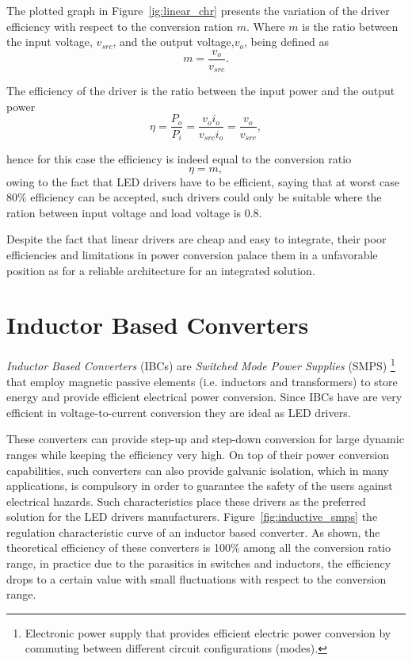 The plotted graph in Figure~\ref{ig:linear_chr} presents the variation of the driver efficiency with respect to the conversion ration $m$. Where $m$  is the ratio between the input voltage, $v_{src}$,  and the output voltage,$v_o$, being defined as
   \begin{equation}
        m = \frac{v_o}{v_{src}}.
   \end{equation}

The efficiency of the driver is the ratio between the input power and the output power
   \begin{equation}
        \eta = \frac{P_o}{P_i} = \frac{v_o i_o}{v_{src} i_o} = \frac{v_o}{v_{src}},
   \end{equation}

hence for this case the efficiency is indeed equal to the conversion ratio
   \begin{equation}
        \eta = m,
   \end{equation}
owing to the fact that LED drivers have to be efficient, saying that at worst case 80\% efficiency can be accepted, such drivers could only be suitable where the ration between input voltage and load voltage is 0.8.

Despite the fact that linear drivers are cheap and easy to integrate, their poor efficiencies and limitations in power conversion palace them in a unfavorable position as for a reliable architecture for an integrated solution.

\section{Inductor Based Converters}

\emph{Inductor Based Converters} (IBCs) are \emph{Switched Mode Power Supplies} (SMPS) \footnote{Electronic power supply that provides efficient electric power conversion by commuting between different circuit configurations (modes).}  that employ magnetic passive elements (i.e. inductors and transformers) to store energy and provide efficient electrical power conversion. Since IBCs have are very efficient in voltage-to-current conversion they are ideal as LED drivers.

These converters can provide step-up and step-down conversion for large dynamic ranges while keeping the efficiency very high. On top of their power conversion capabilities, such converters can also provide galvanic isolation, which in many applications, is compulsory in order to guarantee the safety of the users against electrical hazards. Such characteristics place these drivers as the preferred solution for the LED drivers manufacturers. Figure~\ref{fig:inductive_smps} the regulation characteristic curve of an inductor based converter. As shown, the theoretical efficiency of these converters is 100\% among all the conversion ratio range, in practice due to the parasitics in switches and inductors, the efficiency drops to a certain value with small fluctuations with respect to the conversion range.

